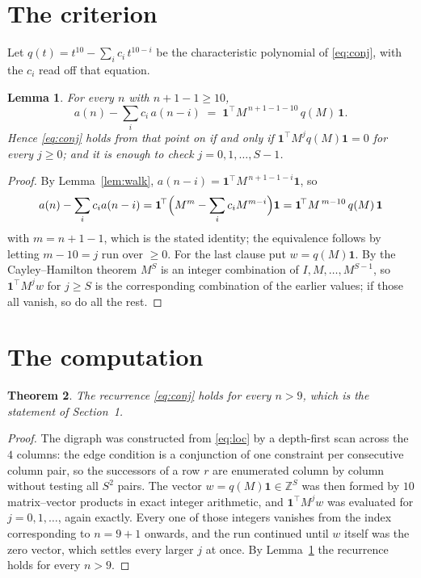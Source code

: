 \documentclass[11pt,a4paper]{article}
\theoremstyle{plain}
\newtheorem{theorem}{Theorem}
\newtheorem{lemma}[theorem]{Lemma}
\theoremstyle{definition}
\begin{document}
\section{The criterion}

Let $q(t)=t^{10}-\sum_i c_i\,t^{10-i}$ be the characteristic polynomial of
\eqref{eq:conj}, with the $c_i$ read off that equation.

\begin{lemma}\label{lem:crit}
For every $n$ with $n+1-1\ge10$,
\[
a(n)-\sum_i c_i\,a(n-i)\;=\;\mathbf{1}^{\!\top}M^{\,n+1-1-10}\,q(M)\,\mathbf{1} .
\]
Hence \eqref{eq:conj} holds from that point on if and only if
$\mathbf{1}^{\!\top}M^{j}q(M)\mathbf{1}=0$ for every $j\ge0$; and it is enough to check
$j=0,1,\dots,S-1$.
\end{lemma}

\begin{proof}
By Lemma~\ref{lem:walk}, $a(n-i)=\mathbf{1}^{\!\top}M^{\,n+1-1-i}\mathbf{1}$, so
\[
a(n)-\sum_i c_i a(n-i)
=\mathbf{1}^{\!\top}\Bigl(M^{m}-\sum_i c_i M^{m-i}\Bigr)\mathbf{1}
=\mathbf{1}^{\!\top}M^{\,m-10}\,q(M)\,\mathbf{1}
\]
with $m=n+1-1$, which is the stated identity; the equivalence follows by letting
$m-10=j$ run over $\ge0$. For the last clause put $w=q(M)\mathbf{1}$. By the
Cayley--Hamilton theorem $M^{S}$ is an integer combination of $I,M,\dots,M^{S-1}$, so
$\mathbf{1}^{\!\top}M^{j}w$ for $j\ge S$ is the corresponding combination of the earlier
values; if those all vanish, so do all the rest.
\end{proof}

\section{The computation}

\begin{theorem}
The recurrence \eqref{eq:conj} holds for every $n>9$, which is the statement of
Section~1.
\end{theorem}

\begin{proof}
The digraph was constructed from \eqref{eq:loc} by a depth-first scan across the $4$
columns: the edge condition is a conjunction of one constraint per consecutive column
pair, so the successors of a row $r$ are enumerated column by column without testing all
$S^2$ pairs. The vector $w=q(M)\mathbf{1}\in\mathbb{Z}^{S}$ was then formed by $10$
matrix--vector products in exact integer arithmetic, and $\mathbf{1}^{\!\top}M^{j}w$ was
evaluated for $j=0,1,\dots$, again exactly. Every one of those integers vanishes from the
index corresponding to $n=9+1$ onwards, and the run continued until $w$ itself was the
zero vector, which settles every larger $j$ at once. By Lemma~\ref{lem:crit} the recurrence
holds for every $n>9$.
\end{proof}
\end{document}
